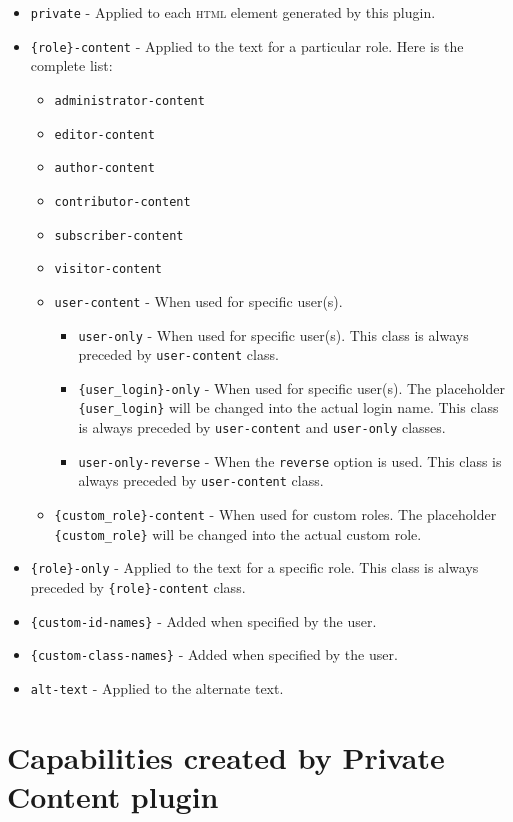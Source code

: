 \documentclass[a4paper,10pt]{article}
\begin{document}
\begin{itemize}
 \item \verb+private+ - Applied to each \textsc{html} element generated by this plugin.
 \item \verb+{role}-content+ - Applied to the text for a particular role. Here is the complete list:
 \begin{itemize}
  \item \verb+administrator-content+
  \item \verb+editor-content+
  \item \verb+author-content+
  \item \verb+contributor-content+
  \item \verb+subscriber-content+
  \item \verb+visitor-content+
  \item \verb+user-content+ - When used for specific user(s).
  \begin{itemize}
   \item \verb+user-only+ - When used for specific user(s). This class is always preceded by \verb+user-content+ class.
    \item \verb+{user_login}-only+ - When used for specific user(s). The placeholder \verb+{user_login}+ will be changed into the actual login name. This class is always preceded by \verb+user-content+ and \verb+user-only+ classes.
    \item \verb+user-only-reverse+ - When the \verb+reverse+ option is used. This class is always preceded by \verb+user-content+ class.
  \end{itemize}
  \item \verb+{custom_role}-content+ - When used for custom roles. The placeholder \verb+{custom_role}+ will be changed into the actual custom role.
  \end{itemize}
 \item \verb+{role}-only+ - Applied to the text for a specific role. This class is always preceded by \verb+{role}-content+ class.
 \item \verb+{custom-id-names}+ - Added when specified by the user.
 \item \verb+{custom-class-names}+ - Added when specified by the user.
 \item \verb+alt-text+ - Applied to the alternate text.
\end{itemize}

\section{Capabilities created by Private Content plugin}
\end{document}
